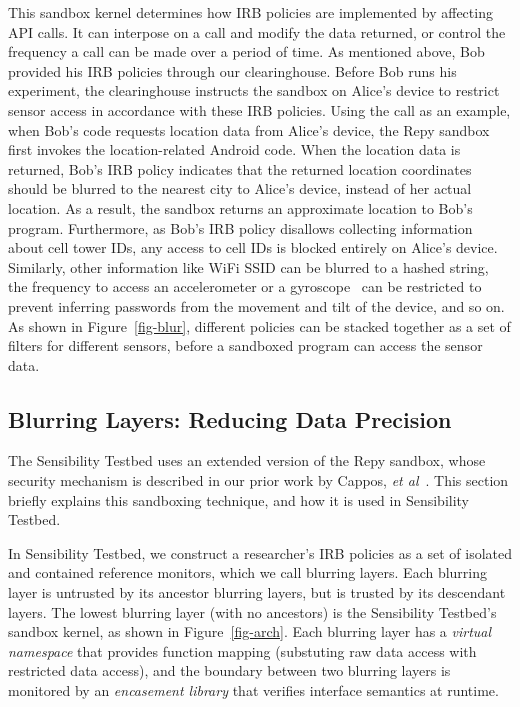 This sandbox kernel determines how IRB policies are implemented by affecting API calls. It can
interpose on a call and modify the data returned, or control the frequency a call can be made over
a period of time. As mentioned above, Bob provided his IRB policies through our clearinghouse.
Before Bob runs his experiment, the clearinghouse instructs the sandbox on Alice's device to
restrict sensor access in accordance with these IRB policies. Using the  call
as an example, when Bob's code requests location data from Alice's device, the Repy sandbox first
invokes the location-related Android code. When the location data is returned, Bob's IRB policy
indicates that the returned location coordinates should be blurred to the nearest city to Alice's
device, instead of her actual location. As a result, the sandbox returns an approximate location to
Bob's program. Furthermore, as Bob's IRB policy disallows collecting information about cell tower
IDs, any access to cell IDs is blocked entirely on Alice's device. Similarly, other information
like WiFi SSID can be blurred to a hashed string, the frequency to access an accelerometer or a
gyroscope~\cite{michalevsky2014gyrophone} can be restricted to prevent inferring passwords from the
movement and tilt of the device, and so on. As shown in Figure~\ref{fig-blur}, different policies
can be stacked together as a set of filters for different sensors, before a sandboxed program can
access the sensor data.

\subsection{Blurring Layers: Reducing Data Precision}\label{sec-layer}

The Sensibility Testbed uses an extended version of the Repy sandbox, whose 
security mechanism is described in our prior work by Cappos, {\it et 
al}~\cite{cappos2010retaining}. This section briefly explains this sandboxing 
technique, and how it is used in Sensibility Testbed.

In Sensibility Testbed, we construct a researcher's IRB policies as a set of 
isolated and contained reference monitors, which we call blurring layers. 
Each blurring layer is untrusted by its ancestor blurring layers, but is trusted
by its descendant layers. The lowest blurring layer (with no ancestors) is the 
Sensibility Testbed's sandbox kernel, as shown in Figure~\ref{fig-arch}. Each 
blurring layer has a \textit{virtual namespace} that provides function mapping 
(substuting raw data access with restricted data access), and the boundary 
between two blurring layers is monitored by an \textit{encasement library} that
verifies interface semantics at runtime. 

